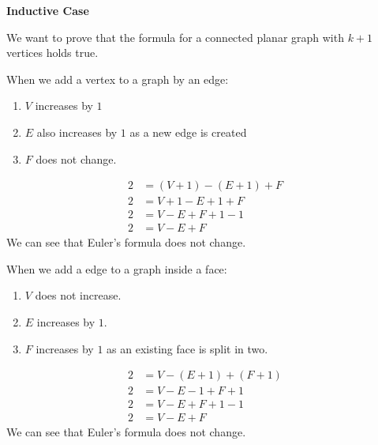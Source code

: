 \documentclass{article}
\begin{document}
\textbf{Inductive Case}

We want to prove that the formula for a connected planar graph with $k+1$ vertices holds true.

When we add a vertex to a graph by an edge:

\begin{enumerate}
    \item $V$ increases by $1$
    \item $E$ also increases by $1$ as a new edge is created
    \item $F$ does not change.
\end{enumerate}

\begin{align*}
    2 &= (V + 1) - (E + 1) + F \\
    2 &= V +1 - E + 1 + F \\
    2 &= V - E + F + 1 - 1 \\
    2 &= V - E + F
    \end{align*}
We can see that Euler's formula does not change.
\vspace{1cm}

When we add a edge to a graph inside a face:

\begin{enumerate}
    \item $V$ does not increase.
    \item $E$ increases by $1$.
    \item $F$ increases by $1$ as an existing face is split in two.
\end{enumerate}

\begin{align*}
    2 &= V - (E + 1) + (F + 1) \\
    2 &= V - E - 1 + F + 1 \\
    2 &= V - E + F + 1 - 1 \\
    2 &= V - E + F
    \end{align*}
We can see that Euler's formula does not change.
\end{document}
